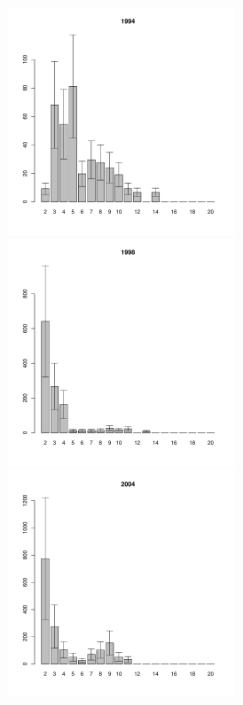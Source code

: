\documentclass[12pt, a4paper]{article}
\begin{document}
\begin{figure}[h]
\begin{multicols}{3}
\hfill
\includegraphics[width=60mm]{../White_Sea/Luvenga_II_razrez/high_beatch2_1994_.pdf}
\hfill
\includegraphics[width=60mm]{../White_Sea/Luvenga_II_razrez/high_beatch2_1998_.pdf}
\hfill
\includegraphics[width=60mm]{../White_Sea/Luvenga_II_razrez/high_beatch2_2004_.pdf}
\end{multicols}



\end{figure}
\end{document}
